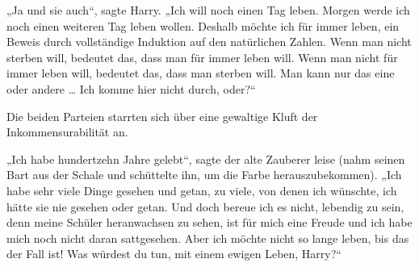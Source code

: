 „Ja und sie auch“, sagte Harry.
„Ich will noch einen Tag leben. Morgen werde ich noch einen weiteren Tag leben wollen. Deshalb möchte ich für immer leben, ein Beweis durch vollständige Induktion auf den natürlichen Zahlen. Wenn man nicht sterben will, bedeutet das, dass man für immer leben will. Wenn man nicht für immer leben will, bedeutet das, dass man sterben will. Man kann nur das eine oder andere … Ich komme hier nicht durch, oder?“

Die beiden Parteien starrten sich über eine gewaltige Kluft der Inkommensurabilität an.%

„Ich habe hundertzehn Jahre gelebt“, sagte der alte Zauberer leise (nahm seinen Bart aus der Schale und schüttelte ihn, um die Farbe herauszubekommen).
„Ich habe sehr viele Dinge gesehen und getan, zu viele, von denen ich wünschte, ich hätte sie nie gesehen oder getan. Und doch bereue ich es nicht, lebendig zu sein, denn meine Schüler heranwachsen zu sehen, ist für mich eine Freude und ich habe mich noch nicht daran sattgesehen. Aber ich möchte nicht so lange leben, bis das der Fall ist! Was würdest du tun, mit einem ewigen Leben, Harry?“

